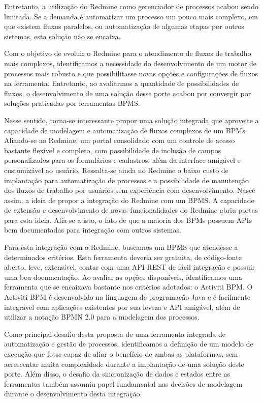 Entretanto, a utilização do Redmine como gerenciador de processos acabou sendo limitada. Se a demanda é automatizar um processo um pouco mais complexo, em que existem fluxos paralelos, ou automatização de algumas etapas por outros sistemas, esta solução não se encaixa.

Com o objetivo de evoluir o Redmine para o atendimento de fluxos de trabalho mais complexos, identificamos a necessidade do desenvolvimento de um motor de processos mais robusto e que possibilitasse novas opções e configurações de fluxos na ferramenta. Entretanto, ao avaliarmos a quantidade de possibilidades de fluxos, o desenvolvimento de uma solução desse porte acabou por convergir por soluções praticadas por ferramentas BPMS. 

Nesse sentido, torna-se interessante propor uma solução integrada que aproveite a capacidade de modelagem e automatização de fluxos complexos de um BPMs. Aliando-se ao Redmine, um portal consolidado com um controle de acesso bastante flexível e completo, com possibilidade de inclusão de campos personalizados para os formulários e cadastros, além da interface amigável e customizável ao usuário. Ressalta-se ainda no Redmine o baixo custo de implantação para automatização de processos e a possibilidade de manutenção dos fluxos de trabalho por usuários sem experiência com desenvolvimento. Nasce assim, a ideia de propor a integração do Redmine com um BPMS. A capacidade de extensão e desenvolvimento de novas funcionalidades do Redmine abriu portas para esta ideia. Alia-se a isto, o fato de que a maioria dos BPMs possuem APIs bem documentadas para integração com outros sistemas.

Para esta integração com o Redmine, buscamos um BPMS que atendesse a determinados critérios. Esta ferramenta deveria ser gratuita, de código-fonte aberto, leve, extensível, contar com uma API REST de fácil integração e possuir uma boa documentação. Ao avaliar as opções disponíveis, identificamos uma ferramenta que se encaixava bastante nos critérios adotados: o Activiti BPM. O Activiti BPM é desenvolvido na linguagem de programação Java\cite{java-history} e é facilmente integrável com aplicações existentes por sua leveza e API\cite{api} amigável, além de utilizar a notação BPMN 2.0 para a modelagem dos processos.

Como principal desafio desta proposta de uma ferramenta integrada de automatização e gestão de processos, identificamos a definição de um modelo de execução que fosse capaz de aliar o benefício de ambas as plataformas, sem acrescentar muita complexidade durante a implantação de uma solução deste porte. Além disso, o desafio da sincronização de dados e estados entre as ferramentas também assumiu papel fundamental nas decisões de modelagem durante o desenvolvimento desta integração.


